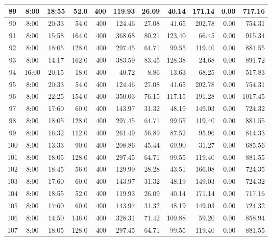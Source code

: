 \begin{landscape}
\begin{longtable}{|c|c|c|r|r|r|r|r|r|r|r|}
\hline
\rowcolor{gray!8}
89 & 8:00 & 18:55 & 52.0 & 400 & 119.93 & 26.09 & 40.14 & 171.14 & 0.00 & 717.16 \\
\hline
90 & 8:00 & 20:33 & 54.0 & 400 & 124.46 & 27.08 & 41.65 & 202.78 & 0.00 & 754.31 \\
\hline
\rowcolor{gray!8}
91 & 8:00 & 15:58 & 164.0 & 400 & 368.68 & 80.21 & 123.40 & 66.45 & 0.00 & 915.34 \\
\hline
92 & 8:00 & 18:05 & 128.0 & 400 & 297.45 & 64.71 & 99.55 & 119.40 & 0.00 & 881.55 \\
\hline
\rowcolor{gray!8}
93 & 8:00 & 14:17 & 162.0 & 400 & 383.59 & 83.45 & 128.38 & 24.68 & 0.00 & 891.72 \\
\hline
94 & 16:00 & 20:15 & 18.0 & 400 & 40.72 & 8.86 & 13.63 & 68.25 & 0.00 & 517.83 \\
\hline
\rowcolor{gray!8}
95 & 8:00 & 20:33 & 54.0 & 400 & 124.46 & 27.08 & 41.65 & 202.78 & 0.00 & 754.31 \\
\hline
96 & 8:00 & 22:25 & 154.0 & 400 & 350.03 & 76.15 & 117.15 & 191.28 & 0.00 & 1017.45 \\
\hline
\rowcolor{gray!8}
97 & 8:00 & 17:60 & 60.0 & 400 & 143.97 & 31.32 & 48.19 & 149.03 & 0.00 & 724.32 \\
\hline
98 & 8:00 & 18:05 & 128.0 & 400 & 297.45 & 64.71 & 99.55 & 119.40 & 0.00 & 881.55 \\
\hline
\rowcolor{gray!8}
99 & 8:00 & 16:32 & 112.0 & 400 & 261.49 & 56.89 & 87.52 & 95.96 & 0.00 & 814.33 \\
\hline
100 & 8:00 & 13:33 & 90.0 & 400 & 208.86 & 45.44 & 69.90 & 31.27 & 0.00 & 685.56 \\
\hline
\rowcolor{gray!8}
101 & 8:00 & 18:05 & 128.0 & 400 & 297.45 & 64.71 & 99.55 & 119.40 & 0.00 & 881.55 \\
\hline
102 & 8:00 & 18:45 & 56.0 & 400 & 129.99 & 28.28 & 43.51 & 166.08 & 0.00 & 724.35 \\
\hline
\rowcolor{gray!8}
103 & 8:00 & 17:60 & 60.0 & 400 & 143.97 & 31.32 & 48.19 & 149.03 & 0.00 & 724.32 \\
\hline
104 & 8:00 & 18:55 & 52.0 & 400 & 119.93 & 26.09 & 40.14 & 171.14 & 0.00 & 717.16 \\
\hline
\rowcolor{gray!8}
105 & 8:00 & 17:60 & 60.0 & 400 & 143.97 & 31.32 & 48.19 & 149.03 & 0.00 & 724.32 \\
\hline
106 & 8:00 & 14:50 & 146.0 & 400 & 328.31 & 71.42 & 109.88 & 59.20 & 0.00 & 858.94 \\
\hline
\rowcolor{gray!8}
107 & 8:00 & 18:05 & 128.0 & 400 & 297.45 & 64.71 & 99.55 & 119.40 & 0.00 & 881.55 \\

\end{longtable}
\end{landscape}
